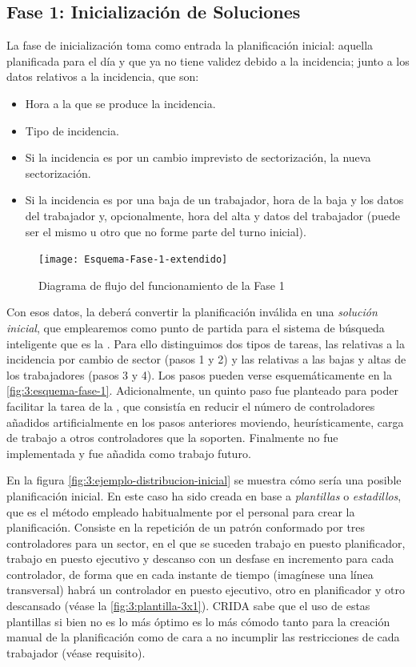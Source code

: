 \subsection{Fase 1: Inicialización de Soluciones} \label{sec:3:inicializacion-soluciones}

La fase de inicialización toma como entrada la planificación inicial: aquella planificada para el día y que ya no tiene validez debido a la incidencia; junto a los datos relativos a la incidencia, que son:

\begin{itemize}
	\item Hora a la que se produce la incidencia.
	\item Tipo de incidencia.
	\item Si la incidencia es por un cambio imprevisto de sectorización, la nueva sectorización.
	\item Si la incidencia es por una baja de un trabajador, hora de la baja y los datos del trabajador y, opcionalmente, hora del alta y datos del trabajador (puede ser el mismo u otro que no forme parte del turno inicial).
\end{itemize}

\begin{figure}[htbp]
	\centering
	\texttt{[image: Esquema-Fase-1-extendido]}
	\caption{Diagrama de flujo del funcionamiento de la Fase 1}
	\label{fig:3:esquema-fase-1}
\end{figure}

Con esos datos, la \faseuno{} deberá convertir la planificación inválida en una \textit{solución inicial}, que 
emplearemos como punto de partida para el sistema de búsqueda inteligente que es la \fasedos{}. Para ello distinguimos dos tipos de tareas, las relativas a la incidencia por cambio de sector (pasos 1 y 2) y las relativas a las bajas y altas de los trabajadores (pasos 3 y 4). Los pasos pueden verse esquemáticamente en la \autoref{fig:3:esquema-fase-1}.
Adicionalmente, un quinto paso fue planteado para poder facilitar la tarea de la \fasedos{}, que consistía en reducir el número de controladores añadidos artificialmente en los pasos anteriores moviendo, heurísticamente, carga de trabajo a otros controladores que la soporten. Finalmente no fue implementada y fue añadida como trabajo futuro.

En la figura \autoref{fig:3:ejemplo-distribucion-inicial} se muestra cómo sería una posible planificación inicial. En este caso ha sido creada en base a \textit{plantillas} o \textit{estadillos}, que es el método empleado habitualmente por el personal para crear la planificación. Consiste en la repetición de un patrón conformado por tres 
controladores para un sector, en el que se suceden trabajo en puesto planificador, trabajo en puesto ejecutivo y descanso con un desfase en incremento para cada controlador, de forma que en cada instante de tiempo (imagínese una línea transversal) habrá un controlador en puesto ejecutivo, otro en planificador y otro descansado (véase  la \autoref{fig:3:plantilla-3x1}). \gls{CRIDA} sabe que el uso de estas plantillas si bien no es lo más óptimo es lo más cómodo tanto para la creación manual de la planificación como de cara a no incumplir las restricciones de cada trabajador (véase requisito). %

